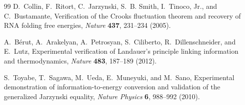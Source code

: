\begin{thebibliography}{99}
D.~Collin, F.~Ritort, C.~Jarzynski, S.~B. Smith, I.~Tinoco, Jr., and C.~Bustamante,
Verification of the Crooks fluctuation theorem and recovery of RNA folding free energies,
\emph{Nature} \textbf{437}, 231--234 (2005).

A.~Bérut, A.~Arakelyan, A.~Petrosyan, S.~Ciliberto, R.~Dillenschneider, and E.~Lutz,
Experimental verification of Landauer's principle linking information and thermodynamics,
\emph{Nature} \textbf{483}, 187--189 (2012).

S.~Toyabe, T.~Sagawa, M.~Ueda, E.~Muneyuki, and M.~Sano,
Experimental demonstration of information-to-energy conversion and validation of the generalized Jarzynski equality,
\emph{Nature Physics} \textbf{6}, 988--992 (2010).

\end{thebibliography}
